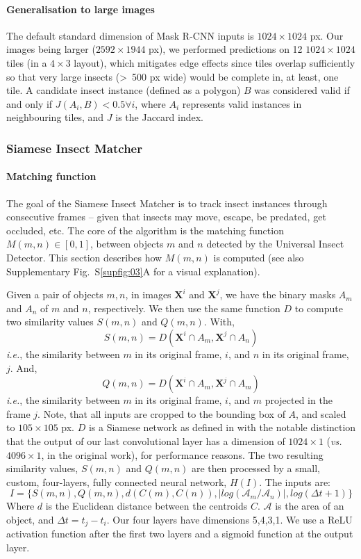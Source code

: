 \documentclass[12pt]{article}
\begin{document}
\begin{linenumbers}
		\paragraph{Generalisation to large images}
		The default standard dimension of Mask R-CNN inputs is $1024 \times{} 1024$ px. 
		Our images being larger ($2592 \times{} 1944$ px), we performed predictions on 12 $1024 \times{}1024$ tiles (in a $4 \times{} 3$ layout), which mitigates edge effects since tiles overlap sufficiently so that very large insects (>~500 px wide) would be complete in, at least, one tile. A candidate insect instance (defined as a polygon) $B$ was considered valid if and only if $J(A_{i}, B) < 0.5 \forall i$, where $A_i$ represents valid instances in neighbouring tiles, and $J$ is the Jaccard index.
		
		\subsubsection*{Siamese Insect Matcher}
		\paragraph{Matching function}
		The goal of the Siamese Insect Matcher is to track insect instances through consecutive frames – given that insects may move, escape, be predated, get occluded, etc. The core of the algorithm is the matching function $M(m,n) \in [0, 1]$, between objects $m$ and $n$ detected by the Universal Insect Detector. This section describes how $M(m,n)$ is computed (see also Supplementary Fig.~S\ref{supfig:03}A for a visual explanation).
		
		Given a pair of objects $m, n$, in images $\mathbf{X}^i$ and $\mathbf{X}^j$, we have the binary masks $A_m$ and $A_n$ of $m$ and $n$, respectively.
		We then use the same function $D$ to compute two similarity values $S(m,n)$ and $Q(m,n)$. 
		With,
		$$
		S(m,n) = D(\mathbf{X}^i \cap A_m , \mathbf{X}^j \cap A_n )
		$$
		\emph{i.e.}, the similarity between $m$ in its original frame, $i$, and $n$ in its original frame, $j$. And,
		$$
		Q(m,n) = D(\mathbf{X}^i \cap  A_m , \mathbf{X}^j \cap A_m )
		$$
		\emph{i.e.}, the similarity between $m$ in its original frame, $i$, and $m$ projected in the frame $j$. Note, that all inputs are cropped to the bounding box of $A$, and scaled to $105 \times{} 105$ px. $D$ is a Siamese network as defined in\cite{koch_siamese_2015} with the notable distinction that the output of our last convolutional layer has a dimension of $1024 \times{} 1$ (\emph{vs.} $4096 \times{} 1$, in the original work), for performance reasons. The two resulting similarity values, $S(m,n)$ and $Q(m,n)$ are then processed by a small, custom, four-layers, fully connected neural network, $H(I)$. The inputs are: 
		$$
		I=\{ S(m,n), Q(m,n), d(C(m), C(n)), |log(\mathcal{A}_m/\mathcal{A}_n)|, log(\Delta t + 1)\}
		$$ Where $d$ is the Euclidean distance between the centroids $C$. $\mathcal{A}$ is the area of an object, and $\Delta t = t_j- t_i$. Our four layers have dimensions {5,4,3,1}. We use a ReLU activation function after the first two layers and a sigmoid function at the output layer.
		

\end{linenumbers}
\end{document}
